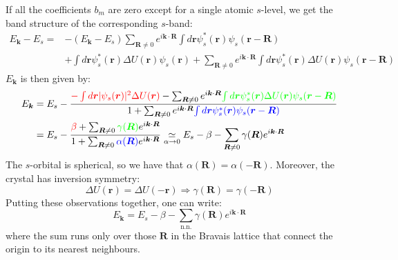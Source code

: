 \documentclass[10.75pt,a4paper,openright,bottom=2cm]{article}
\renewcommand{\Vec}[1]{\boldsymbol{#1}}
\begin{document}
If all the coefficients $b_m$ are zero except for a single atomic $s$-level, we get the band structure of the corresponding $s$-band:
\begin{align*}
E_{\Vec{k}}-E_s=&-(E_{\Vec{k}}-E_s)\sum_{\Vec{R}\neq0}e^{i\Vec{k}\cdot\Vec{R}}\int d\Vec{r}\psi_s^*(\Vec{r})\psi_s(\Vec{r}-\Vec{R})\\
&+\int d\Vec{r}\psi_s^*(\Vec{r})\Delta U(\Vec{r})\psi_s(\Vec{r})+\sum_{\Vec{R}\neq0}e^{i\Vec{k}\cdot\Vec{R}}\int d\Vec{r}\psi_s^*(\Vec{r})\Delta U(\Vec{r})\psi_s(\Vec{r}-\Vec{R})
\end{align*}
$E_{\Vec{k}}$ is then given by:
\begin{align*}
E_{\Vec{k}}&=E_s-\frac{{\color{red}{-\int d\Vec{r}|\psi_s(\Vec{r})|^2\Delta U(\Vec{r})}}-\sum_{\Vec{R}\neq0}e^{i\Vec{k}\cdot\Vec{R}}{\color{green}{\int d\Vec{r}\psi_s^*(\Vec{r})\Delta U(\Vec{r})\psi_s(\Vec{r}-\Vec{R})}}}{1+\sum_{\Vec{R}\neq0}e^{i\Vec{k}\cdot\Vec{R}}{\color{blue}{\int d\Vec{r}\psi_s^*(\Vec{r})\psi_s(\Vec{r}-\Vec{R})}}}\\
&=E_s-\frac{{\color{red}{\beta}}+\sum_{\Vec{R}\neq0}{\color{green}{\gamma(\Vec{R})}}e^{i\Vec{k}\cdot\Vec{R}}}{1+\sum_{\Vec{R}\neq0}{\color{blue}{\alpha(\Vec{R})}}e^{i\Vec{k}\cdot\Vec{R}}}\underset{\alpha\to0}{\simeq}E_s-\beta-\sum_{\Vec{R}\neq0}\gamma(\Vec{R})e^{i\Vec{k}\cdot\Vec{R}}
\end{align*}
The $s$-orbital is spherical, so we have that $\alpha(\Vec{R})=\alpha(-\Vec{R})$. Moreover, the crystal has inversion symmetry:
\[
\Delta U(\Vec{r})=\Delta U(-\Vec{r})\Rightarrow\gamma(\Vec{R})=\gamma(-\Vec{R})
\]
Putting these observations together, one can write:
\[
E_{\Vec{k}}=E_s-\beta-\sum_{\text{n.n.}}\gamma(\Vec{R})e^{i\Vec{k}\cdot\Vec{R}}
\]
where the sum runs only over those $\Vec{R}$ in the Bravais lattice that connect the origin to its nearest neighbours.
\end{document}

